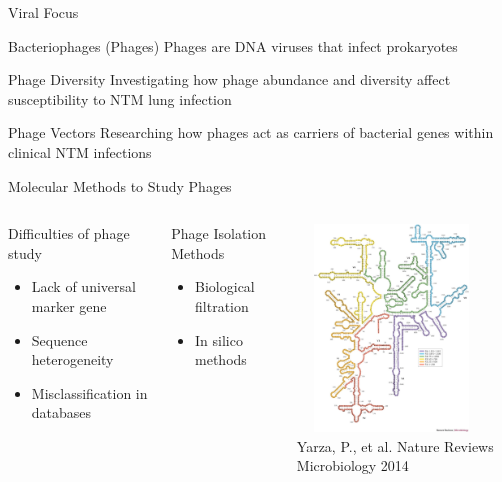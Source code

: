 \documentclass[11pt]{beamer}
\begin{document}
	\begin{frame}{Viral Focus}
	
	\begin{block}{Bacteriophages (Phages)}
	Phages are DNA viruses that infect prokaryotes
	\end{block}
	
	\begin{block}{Phage Diversity}
	Investigating how phage abundance and diversity affect susceptibility to NTM lung infection
	\end{block}
	
	\begin{block}{Phage Vectors}
	Researching how phages act as carriers of bacterial genes within clinical NTM infections
	\end{block}
	
	\end{frame}
	\begin{frame}{Molecular Methods to Study Phages}
	\begin{columns}
	\begin{block}{Difficulties of phage study}
	\begin{itemize}
		\item Lack of universal marker gene
		\item Sequence heterogeneity 
		\item Misclassification in databases
	\end{itemize}
	\end{block}
		
		
	\begin{block}{Phage Isolation Methods}
	\begin{itemize}
		\item Biological filtration
		\item In silico methods
	\end{itemize}
	\end{block}
	
	\includegraphics[height=5.5cm, width=5cm]{ribosome.jpg} \\
	\tiny{Yarza, P., et al. Nature Reviews Microbiology 2014}
	\end{columns}
		
	
	\end{frame}
\end{document}
